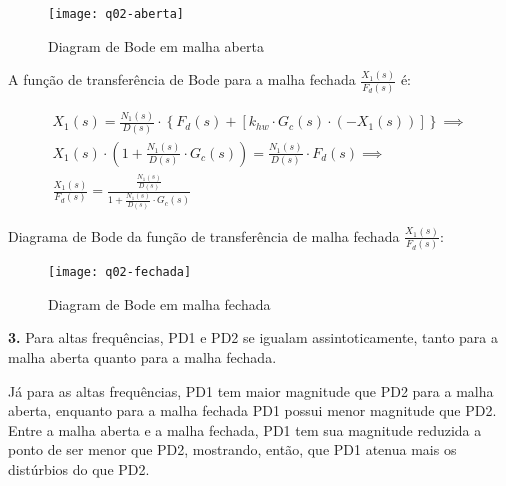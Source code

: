 \documentclass[a4paper,11pt]{article}
\begin{document}
\begin{figure}[H]
\centering
\texttt{[image: q02-aberta]}
\caption{Diagram de Bode em malha aberta}
\end{figure}

A função de transferência de Bode para a malha fechada
$\frac{X_1\left(s\right)}{F_d\left(s\right)}$ é:

\begin{gather*}
    X_1\left(s\right) = \frac{N_1\left(s\right)}{D\left(s\right)} \cdot
        \left\{F_d\left(s\right) + \left[k_{hw} \cdot G_c\left(s\right) \cdot
        \left(- X_1\left(s\right)\right)\right]\right\} \implies \\
    X_1\left(s\right) \cdot \left(1 + \frac{N_1\left(s\right)}{D\left(s\right)}
        \cdot G_c\left(s\right)\right) =
        \frac{N_1\left(s\right)}{D\left(s\right)} \cdot F_d\left(s\right)
        \implies \\
    \frac{X_1\left(s\right)}{F_d\left(s\right)} =
        \frac{\frac{N_1\left(s\right)}{D\left(s\right)}}{1 +
        \frac{N_1\left(s\right)}{D\left(s\right)} \cdot G_c\left(s\right)}
\end{gather*}

\pagebreak

Diagrama de Bode da função de transferência de malha fechada
$\frac{X_1\left(s\right)}{F_d\left(s\right)}$:

\begin{figure}[H]
\centering
\texttt{[image: q02-fechada]}
\caption{Diagram de Bode em malha fechada}
\end{figure}

\textbf{3.}
Para altas frequências, PD1 e PD2 se igualam assintoticamente, tanto para a
malha aberta quanto para a malha fechada. 

Já para as altas frequências, PD1 tem maior magnitude que PD2 para a malha
aberta, enquanto para a malha fechada PD1 possui menor magnitude que PD2. Entre
a malha aberta e a malha fechada, PD1 tem sua magnitude reduzida a ponto de ser
menor que PD2, mostrando, então, que PD1 atenua mais os distúrbios do que PD2. 
\end{document}
